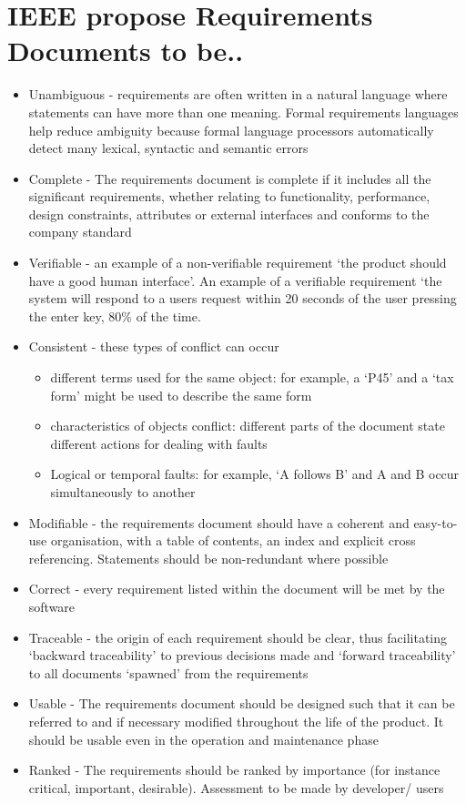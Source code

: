 \documentclass{article}[18pt]
\begin{document}
\section{IEEE propose Requirements Documents to be..}
\begin{itemize}
	\item Unambiguous - requirements are often written in a natural language where statements can have more than one meaning. Formal requirements languages help reduce ambiguity because formal language processors automatically detect many lexical, syntactic and semantic errors
	\item Complete - The requirements document is complete if it includes all the significant requirements, whether relating to functionality, performance, design constraints, attributes or external interfaces and conforms to the company standard
	\item Verifiable - an example of a non-verifiable requirement ‘the product should have a good human interface’. An example of a verifiable requirement ‘the system will respond to a users request within 20 seconds of the user pressing the enter key, 80\% of the time.
	\item Consistent - these types of conflict can occur
	\begin{itemize}
		\item different terms used for the same object: for example, a ‘P45’ and a ‘tax form’ might be used to describe the same form
		\item characteristics of objects conflict: different parts of the document state different actions for dealing with faults
		\item Logical or temporal faults: for example, ‘A follows B’ and A and B occur simultaneously to another
	\end{itemize}
	\item Modifiable - the requirements document should have a coherent and easy-to-use organisation, with a table of contents, an index and explicit cross referencing. Statements should be non-redundant where possible
	\item Correct - every requirement listed within the document will be met by the software
	\item Traceable - the origin of each requirement should be clear, thus facilitating ‘backward traceability’ to previous decisions made and ‘forward traceability’ to all documents ‘spawned’ from the requirements
	\item Usable - The requirements document should be designed such that it can be referred to and if necessary modified throughout the life of the product. It should be usable even in the operation and maintenance phase
	\item Ranked - The requirements should be ranked by importance (for instance critical, important, desirable). Assessment to be made by developer/ users
\end{itemize}
\end{document}
